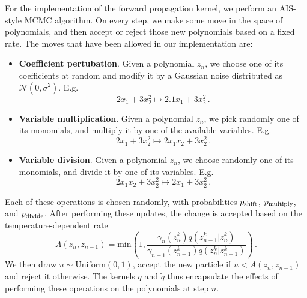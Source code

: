 \documentclass[11pt,a4paper]{article}
\begin{document}
		For the implementation of the forward propagation kernel, we perform an AIS-style MCMC algorithm. 
On every step, we make some move in the space of polynomials, and then accept or reject those new polynomials based on a fixed rate.
The moves that have been allowed in our implementation are:
		\begin{itemize}
			\item \textbf{Coefficient pertubation}. Given a polynomial $z_{n}$, we choose one of its coefficients at random and modify it by a Gaussian noise distributed as $\mathcal{N}(0,\sigma^2)$. E.g.
			\[
				2 x_1 + 3 x_2^2 \mapsto  2.1 x_1 + 3 x_2^2\,.
			\]
			\item \textbf{Variable multiplication}. Given a polynomial $z_{n}$, we pick randomly one of its monomials, and multiply it by one of the available variables. E.g.
			\[
				2 x_1 + 3 x_2^2 \mapsto  2 x_1 x_2 + 3 x_2^2\,.
			\]
			\item \textbf{Variable division}. Given a polynomial $z_{n}$, we choose randomly one of its monomials, and divide it by one of its variables. E.g.
			\[
				2 x_1 x_2 + 3 x_2^2 \mapsto  2 x_1 + 3 x_2^2\,.
			\]
		\end{itemize}
		Each of these operations is chosen randomly, with probabilities $p_{\rm shift}$, $p_{\rm multiply}$, and $p_{\rm divide}$.
After performing these updates, the change is accepted based on the temperature-dependent rate
		\begin{equation}\label{eq:acceptanceratio}
			A(z_n,z_{n-1}) = \mathrm{min} \left(1,\frac{ \gamma_n(z_n^k) q(z_{n-1}^k | z_n^k) }{ \gamma_{n-1}(z_{n-1}^k) q(z_n^k | z_{n-1}^k) }  \right)\,.
		\end{equation}
		We then draw $u\sim \mathrm{Uniform}(0,1)$, accept the new particle if $u<A(z_n,z_{n-1})$ and reject it otherwise.
		The kernels $q$ and $\tilde{q}$ thus encapsulate the effects of performing these operations on the polynomials at step $n$.
		
\end{document}
